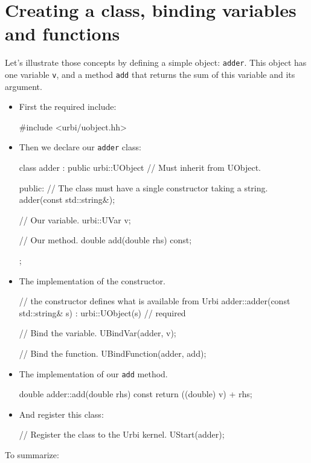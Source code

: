 \section{Creating a class, binding variables and functions}
\label{sec:uob:api:bind}

Let's illustrate those concepts by defining a simple object:
\lstinline{adder}. This object has one variable \lstinline{v}, and a method
\lstinline{add} that returns the sum of this variable and its argument.

\begin{itemize}
\item First the required include:

\begin{cxx}
#include <urbi/uobject.hh>
\end{cxx}

\item Then we declare our \lstinline{adder} class:
\begin{cxx}
class adder : public urbi::UObject // Must inherit from UObject.
{
  public:
   // The class must have a single constructor taking a string.
   adder(const std::string&);

   // Our variable.
   urbi::UVar v;

   // Our method.
   double add(double rhs) const;
};
\end{cxx}

\item The implementation of the constructor.
\begin{cxx}
// the constructor defines what is available from Urbi
adder::adder(const std::string& s)
  : urbi::UObject(s) // required
{
  // Bind the variable.
  UBindVar(adder, v);

  // Bind the function.
  UBindFunction(adder, add);
}
\end{cxx}

\item The implementation of our \lstinline{add} method.
\begin{cxx}
double
adder::add(double rhs) const
{
  return ((double) v) + rhs;
}
\end{cxx}
\item And register this class:
\begin{cxx}
// Register the class to the Urbi kernel.
UStart(adder);
\end{cxx}
\end{itemize}

To summarize:

